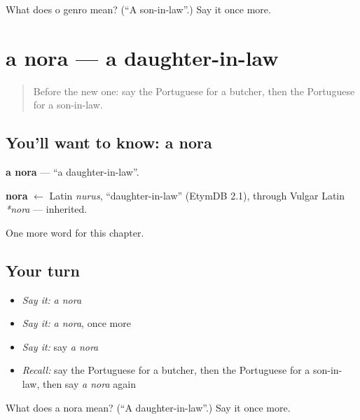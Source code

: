 \begin{tcolorbox}[breakable,colback=teal!4,colframe=teal!35!black,title={Before you move on}]
What does o genro mean? (\textquotedblleft{}A son-in-law\textquotedblright{}.) Say it once more.
\end{tcolorbox}
\section[a nora]{a nora — a daughter-in-law}

\label{lesson:PT-C221-nora}



\begin{quote}
Before the new one: say the Portuguese for a butcher, then the Portuguese for a son-in-law.
\end{quote}

\subsection*{You'll want to know: a nora}
\textbf{a nora} — \textquotedblleft{}a daughter-in-law\textquotedblright{}.

\begin{cousinweb}
\textbf{nora} $\leftarrow$ Latin \emph{nurus}, \textquotedblleft{}daughter-in-law\textquotedblright{} (EtymDB 2.1), through Vulgar Latin \emph{*nora} — inherited.
\end{cousinweb}

\begin{grammarlens}[title={What you've built}]
One more word for this chapter.
\end{grammarlens}

\subsection*{Your turn}
\begin{itemize}
\raggedright
  \item \emph{Say it:} \emph{a nora}
  \item \emph{Say it:} \emph{a nora}, once more
  \item \emph{Say it:} say \emph{a nora}
  \item \emph{Recall:} say the Portuguese for a butcher, then the Portuguese for a son-in-law, then say \emph{a nora} again
\end{itemize}

\begin{tcolorbox}[breakable,colback=teal!4,colframe=teal!35!black,title={Before you move on}]
What does a nora mean? (\textquotedblleft{}A daughter-in-law\textquotedblright{}.) Say it once more.
\end{tcolorbox}
